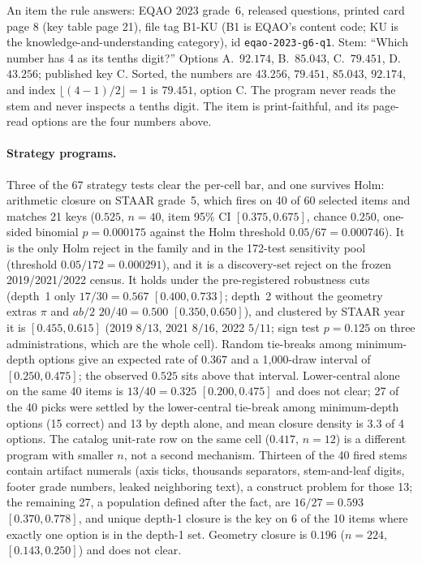 An item the rule answers: EQAO 2023 grade~6, released questions, printed card page 8 (key table page 21), file tag B1-KU (B1 is EQAO's content code; KU is the knowledge-and-understanding category), id \texttt{eqao-2023-g6-q1}. Stem: ``Which number has 4 as its tenths digit?'' Options A.\ $92.174$, B.\ $85.043$, C.\ $79.451$, D.\ $43.256$; published key C. Sorted, the numbers are $43.256$, $79.451$, $85.043$, $92.174$, and index $\lfloor (4-1)/2 \rfloor = 1$ is $79.451$, option C. The program never reads the stem and never inspects a tenths digit. The item is print-faithful, and its page-read options are the four numbers above.

\paragraph{Strategy programs.}
Three of the 67 strategy tests clear the per-cell bar, and one survives Holm: arithmetic closure on STAAR grade~5, which fires on 40 of 60 selected items and matches 21 keys ($0.525$, $n=40$, item 95\% CI $[0.375, 0.675]$, chance $0.250$, one-sided binomial $p=0.000175$ against the Holm threshold $0.05/67=0.000746$). It is the only Holm reject in the family and in the 172-test sensitivity pool (threshold $0.05/172=0.000291$), and it is a discovery-set reject on the frozen 2019/2021/2022 census. It holds under the pre-registered robustness cuts (depth~1 only $17/30=0.567$ $[0.400, 0.733]$; depth~2 without the geometry extras $\pi$ and $ab/2$ $20/40=0.500$ $[0.350, 0.650]$), and clustered by STAAR year it is $[0.455, 0.615]$ (2019 $8/13$, 2021 $8/16$, 2022 $5/11$; sign test $p=0.125$ on three administrations, which are the whole cell). Random tie-breaks among minimum-depth options give an expected rate of $0.367$ and a 1{,}000-draw interval of $[0.250, 0.475]$; the observed $0.525$ sits above that interval. Lower-central alone on the same 40 items is $13/40=0.325$ $[0.200, 0.475]$ and does not clear; 27 of the 40 picks were settled by the lower-central tie-break among minimum-depth options (15 correct) and 13 by depth alone, and mean closure density is $3.3$ of 4 options. The catalog unit-rate row on the same cell ($0.417$, $n=12$) is a different program with smaller $n$, not a second mechanism. Thirteen of the 40 fired stems contain artifact numerals (axis ticks, thousands separators, stem-and-leaf digits, footer grade numbers, leaked neighboring text), a construct problem for those 13; the remaining 27, a population defined after the fact, are $16/27=0.593$ $[0.370, 0.778]$, and unique depth-1 closure is the key on 6 of the 10 items where exactly one option is in the depth-1 set. Geometry closure is $0.196$ ($n=224$, $[0.143, 0.250]$) and does not clear.

